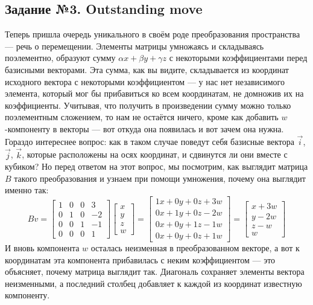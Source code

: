 \documentclass[a3paper,14pt]{extarticle}
\begin{document}
\subsection*{\centering Задание №3. Outstanding move}
Теперь пришла очередь уникального в своём роде преобразования пространства --- речь о перемещении. Элементы матрицы умножаясь и складываясь поэлементно, образуют сумму $\alpha x + \beta y + \gamma z$ с некоторыми коэффициентами перед базисными векторами. Эта сумма, как вы видите, складывается из координат исходного вектора с некоторыми коэффициентом --- у нас нет независимого элемента, который мог бы прибавиться ко всем координатам, не домножив их на коэффициенты. Учитывая, что получить в произведении сумму можно только поэлементным сложением, то нам не остаётся ничего, кроме как добавить $w$-компоненту в векторы --- вот откуда она появилась и вот зачем она нужна.\\[0.5em]
Гораздо интереснее вопрос: как в таком случае поведут себя базисные вектора $\vec{i}$, $\vec{j}$, $\vec{k}$, которые расположены на осях координат, и сдвинутся ли они вместе с кубиком? Но перед ответом на этот вопрос, мы посмотрим, как выглядит матрица $B$ такого преобразования и узнаем при помощи умножения, почему она выглядит именно так:
$$Bv = \begin{bmatrix}
    1 & 0 & 0 & 3 \\ 0 & 1 & 0 & -2 \\ 0 & 0 & 1 & -1 \\ 0 & 0 & 0 & 1
\end{bmatrix}\begin{bmatrix}
    x \\ y \\ z \\ w
\end{bmatrix} = \begin{bmatrix}
    1x + 0y + 0z + 3w \\ 0x + 1y + 0z -2w \\ 0x + 0y + 1z -1w \\ 0x+0y+0z+1w
\end{bmatrix} = \begin{bmatrix}
    x + 3w \\ y - 2w \\ z - w \\ w
\end{bmatrix}$$
И вновь компонента $w$ осталась неизменная в преобразованном векторе, а вот к координатам эта компонента прибавилась с неким коэффициентом --- это объясняет, почему матрица выглядит так. Диагональ сохраняет элементы вектора неизменными, а последний столбец добавляет к каждой из координат известную компоненту.\\[0.5em]
\end{document}
